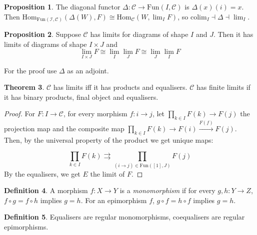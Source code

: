 \documentclass[a4paper,10pt]{article}
\theoremstyle{definition}
\newtheorem{theorem}{Theorem}
\newtheorem{definition}[theorem]{Definition}
\newtheorem{proposition}[theorem]{Proposition}
\newcommand{\Hom}[3][C]{\mathrm{Hom}_\mathcal{#1}(#2, #3)}
\newcommand{\C}{\mathcal{C}}
\begin{document}
\begin{proposition}
    The diagonal functor $\Delta \colon \C \rightarrow \mathrm{Fun}(I, \C)$ is  $\Delta(x)(i) = x$. Then $\Hom[\mathrm{Fun}(I, \C)]{\Delta(W)}{F} \cong \Hom{W}{\lim_I F}$, so $\mathrm{colim}_I \dashv \Delta \dashv \lim_I$.
\end{proposition}

\begin{proposition}
    Suppose $\C$ has limits for diagrams of shape $I$ and $J$. Then it has limits of diagrams of shape $I \times J$ and 
    \[
        \lim_{I \times J} F \cong \lim_I \lim_J F \cong \lim_J \lim_I F
    \]
\end{proposition}
For the proof use $\Delta$ as an adjoint.

\begin{theorem}
    $\C$ has limits iff it has products and equalisers. $\C$ has finite limits if it has binary products, final object and equalisers.
\end{theorem}

\begin{proof}
    For $F \colon I \rightarrow \C$, for every morphism $f \colon i \rightarrow j$, let $\prod_{k \in I} F(k) \rightarrow F(j)$ the projection map and the composite map $\prod_{k \in I} F(k) \rightarrow F(i) \xrightarrow{F(f)} F(j)$. Then, by the universal property of the product we get unique maps: 

    \[
        \prod_{k \in I} F(k) \rightrightarrows \prod_{(i \rightarrow j) \in \mathrm{Fun}([1], J)} F(j)
    \]
    By the equalisers, we get $E$ the limit of $F$.
\end{proof}

\begin{definition}
    A morphism $f \colon X \rightarrow Y$ is a \emph{monomorphism} if for every $g, h \colon Y \rightarrow Z$, $f \circ g = f \circ h$ implies $g = h$. For an epimorphism $f$, $g \circ f = h \circ f$ implies $g = h$. 
\end{definition}
\begin{definition}
    Equalisers are regular monomorphisms, coequalisers are regular epimorphisms.
\end{definition}
\end{document}
